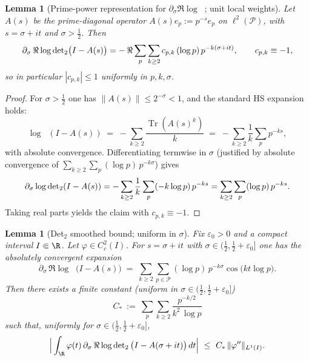 \documentclass[11pt]{article}
\newtheorem{lemma}[theorem]{Lemma}
\theoremstyle{remark}
\newcommand{\PP}{\mathcal{P}}
\DeclareMathOperator{\Tr}{Tr}
\DeclareMathOperator{\dettwo}{det_2}
\begin{document}
\begin{lemma}[Prime-power representation for $\partial_\sigma\Re\log\dettwo$; unit local weights]\label{lem:pp-rep-det2}
Let $A(s)$ be the prime-diagonal operator $A(s)e_p:=p^{-s}e_p$ on $\ell^2(\PP)$, with $s=\sigma+it$ and $\sigma>\tfrac12$. Then
\[
  \partial_\sigma\,\Re\log\dettwo\!\big(I-A(s)\big)
  \\= -\,\Re\sum_{p}\sum_{k\ge 2} c_{p,k}\,(\log p)\,p^{-k(\sigma+it)},\qquad c_{p,k}\equiv -1,
\]
so in particular $|c_{p,k}|\le 1$ uniformly in $p,k,\sigma$.
\end{lemma}
\begin{proof}
For $\sigma>\tfrac12$ one has $\|A(s)\|\le 2^{-\sigma}<1$, and the standard HS expansion holds:
\[
  \log\dettwo(I-A(s))\;=\;-\sum_{k\ge 2} \frac{\Tr(A(s)^k)}{k}\;=\;-\sum_{k\ge 2}\frac1k\sum_{p}p^{-ks},
\]
with absolute convergence. Differentiating termwise in $\sigma$ (justified by absolute convergence of $\sum_{k\ge 2}\sum_p (\log p)\,p^{-k\sigma}$) gives
\[
  \partial_\sigma \log\dettwo(I-A(s))
  \\= -\sum_{k\ge 2}\frac1k\sum_p (-k\log p)\,p^{-ks}
  \\=\sum_{k\ge 2}\sum_p (\log p)\,p^{-ks}.
\]
Taking real parts yields the claim with $c_{p,k}\equiv -1$.
\end{proof}

\begin{lemma}[Det$_2$ smoothed bound; uniform in $\sigma$]\label{lem:det2-smoothed-target}
Fix $\varepsilon_0>0$ and a compact interval $I\Subset\R$. Let $\varphi\in C_c^2(I)$. For $s=\sigma+it$ with $\sigma\in(\tfrac12,\tfrac12+\varepsilon_0]$ one has the absolutely convergent expansion
\[
 \partial_\sigma\,\Re\log\dettwo\big(I-A(s)\big)
 \;=\; \sum_{k\ge 2}\sum_{p\in\PP} (\log p)\,p^{-k\sigma}\cos\big(k t\log p\big).
\]
Then there exists a finite constant (uniform in $\sigma\in(\tfrac12,\tfrac12+\varepsilon_0]$)
\[
 C_*\ :=\ \sum_{p}\sum_{k\ge 2}\frac{p^{-k/2}}{k^2\,\log p}
\]
such that, uniformly for $\sigma\in(\tfrac12,\tfrac12+\varepsilon_0]$,
\[
 \Big|\int_{\R} \varphi(t)\,\partial_\sigma\,\Re\log\dettwo\big(I-A(\sigma+it)\big)\,dt\Big|
 \ \le\ C_*\,\|\varphi''\|_{L^1(I)}.
\]
\end{lemma}
\end{document}
